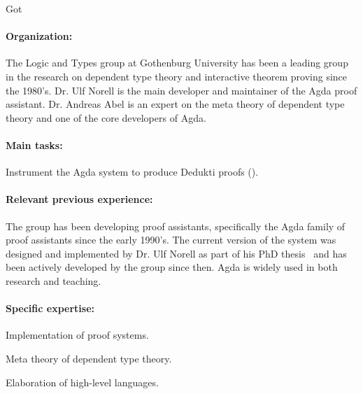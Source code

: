 \begin{sitedescription}{Got}

\paragraph{Organization:}
The Logic and Types group at Gothenburg University has been a leading group
in the research on dependent type theory and interactive theorem proving
since the 1980's. Dr. Ulf Norell is the main developer and maintainer of
the Agda proof assistant. Dr. Andreas Abel is an expert on the meta theory
of dependent type theory and one of the core developers of Agda.

\paragraph{Main tasks:}

\begin{compactitem}
\item Instrument the Agda system to produce Dedukti proofs
  ().
\end{compactitem}

\paragraph{Relevant previous experience:}

The group has been developing proof assistants, specifically the Agda
family of proof assistants since the early 1990's. The current version of
the system was designed and implemented by Dr. Ulf Norell as part of his
PhD thesis~\cite{norell:2007} and has been actively developed by the group
since then. Agda is widely used in both research and teaching.

\paragraph{Specific expertise:}

\begin{compactitem}
\item Implementation of proof systems.
\item Meta theory of dependent type theory.
\item Elaboration of high-level languages.
\end{compactitem}


\end{sitedescription}
